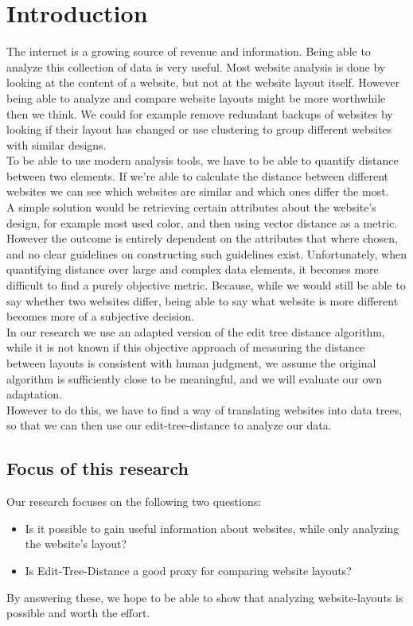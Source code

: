 \chapter{Introduction}\label{introduction}
The internet is a growing source of revenue and information. Being able to analyze this collection of data is very useful. Most website analysis is done by looking at the content of a website, but not at the website layout itself. However being able to analyze and compare website layouts might be more worthwhile then we think. We could for example remove redundant backups of websites by looking if their layout has changed or use clustering to group different websites with similar designs.
\\ To be able to use modern analysis tools, we have to be able to quantify distance between two elements. If we're able to calculate the distance between different websites we can see which websites are similar and which ones differ the most.
\\ A simple solution would be retrieving certain attributes about the website's design, for example most used color, and then using vector distance as a metric. However the outcome is entirely dependent on the attributes that where chosen, and no clear guidelines on constructing such guidelines exist. Unfortunately, when quantifying distance over large and complex data elements, it becomes more difficult to find a purely objective metric. Because, while we would still be able to say whether two websites differ, being able to say what website is more different becomes more of a subjective decision.\\
In our research we use an adapted version of the edit tree distance algorithm, while it is not known if this objective approach of measuring the distance between layouts is consistent with human judgment, we assume the original algorithm is sufficiently close to be meaningful, and we will evaluate our own adaptation.\\
However to do this, we have to find a way of translating websites into data trees, so that we can then use our edit-tree-distance to analyze our data.\\
\section{Focus of this research}
Our research focuses on the following two questions:
\begin{itemize}
\item Is it possible to gain useful information about websites, while only analyzing the website's layout?
\item Is Edit-Tree-Distance a good proxy for comparing website layouts?
\end{itemize}
By answering these, we hope to be able to show that analyzing website-layouts is possible and worth the effort.